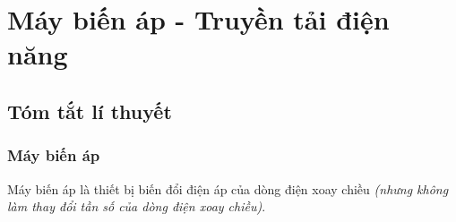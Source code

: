 \section{Máy biến áp - Truyền tải điện năng}
\subsection{Tóm tắt lí thuyết}
\begin{tomtat}
	\subsubsection{Máy biến áp}
	\begin{dn}
		Máy biến áp là thiết bị biến đổi điện áp của dòng điện xoay chiều \textit{(nhưng không làm thay đổi tần số của dòng điện xoay chiều)}.
	\end{dn}

\end{tomtat}
